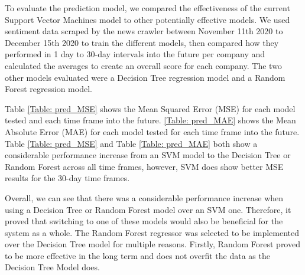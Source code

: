         To evaluate the prediction model, we compared the effectiveness of the current Support Vector Machines model to other potentially effective models. We used sentiment data scraped by the news crawler between November 11th 2020 to December 15th 2020 to train the different models, then compared how they performed in 1 day to 30-day intervals into the future per company and calculated the averages  to create an overall score for each company. The two other models evaluated were a Decision Tree regression model and a Random Forest regression model. 
        
        Table \ref{Table: pred_MSE} shows the Mean Squared Error (MSE) for each model tested and each time frame into the future. \ref{Table: pred_MAE} shows the Mean Absolute Error (MAE) for each model tested for each time frame into the future. Table \ref{Table: pred_MSE} and Table \ref{Table: pred_MAE} both show a considerable performance increase from an SVM model to the Decision Tree or Random Forest across all time frames, however, SVM does show better MSE results for the 30-day time frames.
        
        Overall, we can see that there was a considerable performance increase when using a Decision Tree or Random Forest model over an SVM one. Therefore, it proved that switching to one of these models would also be beneficial for the system as a whole. The Random Forest regressor was selected to be implemented over the Decision Tree model for multiple reasons. Firstly, Random Forest proved to be more effective in the long term and does not overfit the data as the Decision Tree Model does.
        
